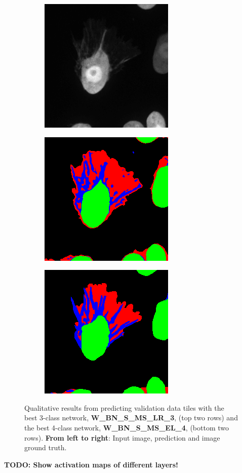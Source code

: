 \begin {figure}[!htb]
\begin {subfigure}[b]{0.25\linewidth}
	\end {subfigure}
	\par\medskip
	\begin {subfigure}[b]{0.25\linewidth}
		\includegraphics[scale=0.45]{img/fig_quali_tile4.png}
	\end {subfigure}\hspace{0.5cm}
	\begin {subfigure}[b]{0.25\linewidth}
		\includegraphics[scale=0.45]{img/fig_quali_tile4_pred_c4.png}
	\end {subfigure}\hspace{0.5cm}
	\begin {subfigure}[b]{0.25\linewidth}
		\includegraphics[scale=0.45]{img/fig_quali_tile4_pred_c4_GT.png}
	\end {subfigure}

		\caption[Qualitative prediction results.]{Qualitative results from predicting validation data tiles with the best 3-class network, \textbf{W\_BN\_S\_MS\_LR\_3}, (top two rows) and the best 4-class network, \textbf{W\_BN\_S\_MS\_EL\_4}, (bottom two rows). \textbf{From left to right}: Input image, prediction and image ground truth.}
		\label{fig:qualitative}
\end {figure}


\textbf{TODO: Show activation maps of different layers!}\\